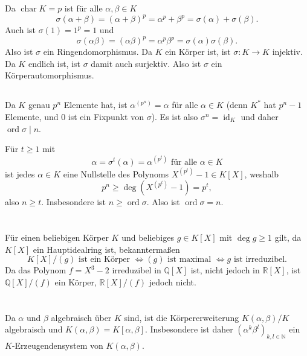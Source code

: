 \documentclass[a4paper,10pt]{article}
\theoremstyle{definition}
\newcommand{\N}{\mathbb{N}}
\newcommand{\Q}{\mathbb{Q}}
\newcommand{\R}{\mathbb{R}}
\newcommand{\id}{\operatorname{id}}
\newcommand{\ord}{\operatorname{ord}}
\newcommand{\kchar}{\operatorname{char}}
\begin{document}
Da $\kchar K = p$ ist für alle $\alpha, \beta \in K$
\[
 \sigma(\alpha + \beta) = (\alpha + \beta)^p = \alpha^p + \beta^p = \sigma(\alpha) + \sigma(\beta).
\]
Auch ist $\sigma(1) = 1^p = 1$ und
\[
 \sigma(\alpha\beta) = (\alpha\beta)^p = \alpha^p \beta^p = \sigma(\alpha) \sigma(\beta).
\]
Also ist $\sigma$ ein Ringendomorphismus. Da $K$ ein Körper ist, ist $\sigma : K \rightarrow K$ injektiv. Da $K$ endlich ist, ist $\sigma$ damit auch surjektiv. Also ist $\sigma$ ein Körperautomorphismus.


\subsection{}
Da $K$ genau $p^n$ Elemente hat, ist $\alpha^{(p^n)} = \alpha$ für alle $\alpha \in K$ (denn $K^*$ hat $p^n-1$ Elemente, und $0$ ist ein Fixpunkt von $\sigma$). Es ist also $\sigma^n = \id_K$ und daher $\ord \sigma \mid n$.

Für $t \geq 1$ mit
\[
 \alpha = \sigma^t(\alpha) = \alpha^{(p^t)} \text{ für alle } \alpha \in K
\]
ist jedes $\alpha \in K$ eine Nullstelle des Polynoms $X^{(p^t)} -1 \in K[X]$, weshalb
\[
 p^n \geq \deg \left( X^{(p^t)}-1 \right) = p^t,
\]
also $n \geq t$. Insbesondere ist $n \geq \ord \sigma$. Also ist $\ord \sigma = n$.







\section{}
Für einen beliebigen Körper $K$ und beliebiges $g \in K[X]$ mit $\deg g \geq 1$ gilt, da $K[X]$ ein Hauptidealring ist, bekanntermaßen
\[
 K[X]/(g) \text{ ist ein Körper }
 \Leftrightarrow (g) \text{ ist maximal }
 \Leftrightarrow g \text{ ist irreduzibel}.
\]
Da das Polynom $f = X^3 - 2$ irreduzibel in $\Q[X]$ ist, nicht jedoch in $\R[X]$, ist $\Q[X]/(f)$ ein Körper, $\R[X]/(f)$ jedoch nicht.





\section{}


\subsection{}
Da $\alpha$ und $\beta$ algebraisch über $K$ sind, ist die Körpererweiterung $K(\alpha,\beta)/K$ algebraisch und $K(\alpha, \beta) = K[\alpha, \beta]$. Insbesondere ist daher $(\alpha^k \beta^l)_{k,l \in \N}$ ein $K$-Erzeugenden\-system von $K(\alpha,\beta)$.
\end{document}
